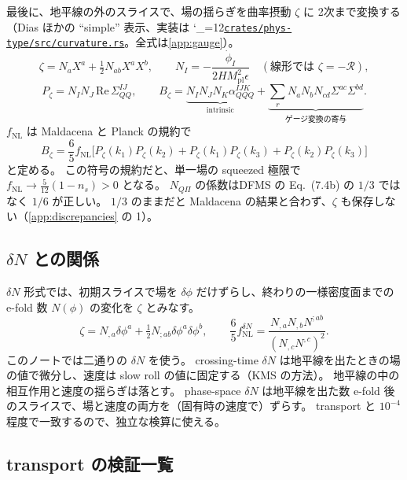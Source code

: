\documentclass[a4paper,11pt]{ltjsarticle}
\newcommand{\Mpl}{M_{\mathrm{pl}}}
\newcommand{\fnl}{f_{\mathrm{NL}}}
\newcommand{\repourl}{https://github.com/inuverse44/phys-type}
\newcommand{\reporev}{b1fea87}
\newcommand{\repo}{\begingroup\catcode`\_=12\relax\repoaux}
\newcommand{\repoaux}[1]{\href{\repourl/blob/\reporev/#1}{\nolinkurl{#1}}\endgroup}
\begin{document}
最後に、地平線の外のスライスで、場の揺らぎを曲率摂動 $\zeta$ に 2次まで変換する（Dias ほか\cite{DEFMS2015}の ``simple'' 表示、実装は \repo{crates/phys-type/src/curvature.rs}。全式は\ref{app:gauge}）。
\[
\zeta=N_aX^a+\tfrac12N_{ab}X^aX^b,\qquad N_I=-\frac{\dot\phi_I}{2H\Mpl^2\epsilon}\quad(\text{線形では }\zeta=-\mathcal R),
\]
\begin{equation}
P_\zeta=N_IN_J\,\mathrm{Re}\,\Sigma^{IJ}_{QQ},\qquad
B_\zeta=\underbrace{N_IN_JN_K\alpha^{IJK}_{QQQ}}_{\text{intrinsic}}
+\underbrace{\sum_rN_aN_bN_{cd}\Sigma^{ac}\Sigma^{bd}}_{\text{ゲージ変換の寄与}} .
\end{equation}
$\fnl$ は Maldacena\cite{Maldacena2003} と Planck\cite{Planck2018X} の規約で
\begin{equation}
B_\zeta=\frac65\fnl\big[P_\zeta(k_1)P_\zeta(k_2)+P_\zeta(k_1)P_\zeta(k_3)+P_\zeta(k_2)P_\zeta(k_3)\big]
\end{equation}
と定める。
この符号の規約だと、単一場の squeezed 極限で $\fnl\to\tfrac5{12}(1-n_s)>0$ となる。
$N_{Q\Pi}$ の係数はDFMS の Eq.~(7.4b)\cite{DFMS2016} の $1/3$ ではなく $1/6$ が正しい。
$1/3$ のままだと Maldacena の結果と合わず、$\zeta$ も保存しない（\ref{app:discrepancies} の 1）。

\subsection{\texorpdfstring{$\delta N$}{δN} との関係}

$\delta N$ 形式では、初期スライスで場を $\delta\phi$ だけずらし、終わりの一様密度面までの e-fold 数 $N(\phi)$ の変化を $\zeta$ とみなす。
\[
\zeta=N_{,a}\delta\phi^a+\tfrac12N_{;ab}\delta\phi^a\delta\phi^b,\qquad
\frac65\fnl^{\delta N}=\frac{N_{,a}N_{,b}N^{;ab}}{(N_{,c}N^{,c})^2}.
\]
このノートでは二通りの $\delta N$ を使う。
crossing-time $\delta N$ は地平線を出たときの場の値で微分し、速度は slow roll の値に固定する（KMS の方法）。
地平線の中の相互作用と速度の揺らぎは落とす。
phase-space $\delta N$ は地平線を出た数 e-fold 後のスライスで、場と速度の両方を（固有時の速度で）ずらす。
transport と $10^{-4}$ 程度で一致するので、独立な検算に使える。

\subsection{transport の検証一覧}
\end{document}
